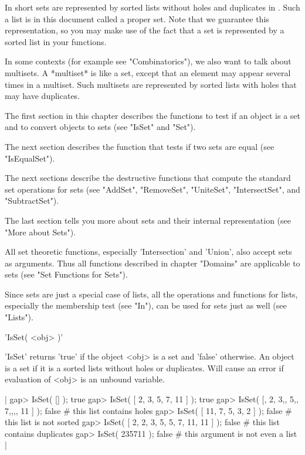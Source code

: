 In   short   sets are represented  by   sorted  lists without  holes  and
duplicates in {\GAP}.  Such  a list is  in this document called a  proper
set.  Note that we guarantee this representation, so  you may make use of
the fact that a set is represented by a sorted list in your functions.

In some contexts (for example see "Combinatorics"),  we also want to talk
about multisets.  A *multiset* is like a set,  except that an element may
appear several  times  in a multiset.   Such multisets are represented by
sorted lists with holes that may have duplicates.

The first section in this chapter  describes the  functions to test if an
object is a set and to convert objects to sets (see "IsSet" and "Set").

The next section describes the function that tests if two sets  are equal
(see "IsEqualSet").

The next sections  describe  the destructive  functions that  compute the
standard   set   operations   for   sets    (see   "AddSet", "RemoveSet",
"UniteSet", "IntersectSet", and "SubtractSet").

The last   section  tells  you more   about   sets  and   their  internal
representation (see "More about Sets").

All set theoretic functions, especially  'Intersection' and 'Union', also
accept  sets  as  arguments.  Thus  all  functions  described in  chapter
"Domains" are applicable to sets (see "Set Functions for Sets").

Since sets are just  a  special case of lists,   all the  operations  and
functions for lists, especially  the membership test  (see "In"),  can be
used for sets just as well (see "Lists").

%

'IsSet( <obj> )'

'IsSet'  returns   'true' if the   object   <obj> is  a set  and  'false'
otherwise.  An object is a  set if it is a  sorted lists without holes or
duplicates.  Will cause an  error if evaluation of   <obj> is an  unbound
variable.

|    gap> IsSet( [] );
    true
    gap> IsSet( [ 2, 3, 5, 7, 11 ] );
    true
    gap> IsSet( [, 2, 3,, 5,, 7,,,, 11 ] );
    false        # this list contains holes
    gap> IsSet( [ 11, 7, 5, 3, 2 ] );
    false        # this list is not sorted
    gap> IsSet( [ 2, 2, 3, 5, 5, 7, 11, 11 ] );
    false        # this list contains duplicates
    gap> IsSet( 235711 );
    false        # this argument is not even a list |

